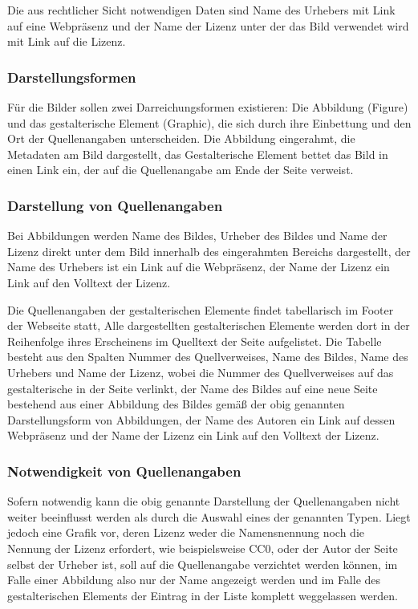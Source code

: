 Die aus rechtlicher Sicht notwendigen Daten sind Name des Urhebers mit Link auf
eine Webpräsenz und der Name der Lizenz unter der das Bild verwendet wird
mit Link auf die Lizenz.

\subsubsection{Darstellungsformen}

Für die Bilder sollen zwei Darreichungsformen existieren: Die Abbildung
(Figure) und das gestalterische Element (Graphic), die sich durch ihre
Einbettung und den Ort der Quellenangaben unterscheiden. Die Abbildung
eingerahmt, die Metadaten am Bild dargestellt, das Gestalterische Element bettet
das Bild in einen Link ein, der auf die Quellenangabe am Ende der Seite verweist.


\subsubsection{Darstellung von Quellenangaben}

Bei Abbildungen werden Name des Bildes, Urheber des Bildes und Name der Lizenz
direkt unter dem Bild innerhalb des eingerahmten Bereichs dargestellt, der Name
des Urhebers ist ein Link auf die Webpräsenz, der Name der Lizenz ein Link
auf den Volltext der Lizenz.

Die Quellenangaben der gestalterischen Elemente findet tabellarisch im Footer der
Webseite statt, Alle dargestellten gestalterischen Elemente werden dort in der
Reihenfolge ihres Erscheinens im Quelltext der Seite aufgelistet. Die Tabelle
besteht aus den Spalten Nummer des Quellverweises, Name des Bildes,
Name des Urhebers und Name der Lizenz, wobei die Nummer des Quellverweises auf
das gestalterische in der Seite verlinkt, der Name des Bildes auf eine neue
Seite bestehend aus einer Abbildung des Bildes gemäß der obig genannten
Darstellungsform von Abbildungen, der Name des Autoren ein Link auf dessen
Webpräsenz und der Name der Lizenz ein Link auf den Volltext der Lizenz.


\subsubsection{Notwendigkeit von Quellenangaben}

Sofern notwendig kann die obig genannte Darstellung der Quellenangaben nicht
weiter beeinflusst werden als durch die Auswahl eines der genannten Typen. Liegt
jedoch eine Grafik vor, deren Lizenz weder die Namensnennung noch die Nennung
der Lizenz erfordert, wie beispielsweise CC0, oder der Autor der Seite selbst der
Urheber ist, soll auf die Quellenangabe verzichtet werden können, im Falle
einer Abbildung also nur der Name angezeigt werden und im Falle des
gestalterischen Elements der Eintrag in der Liste komplett weggelassen werden.

